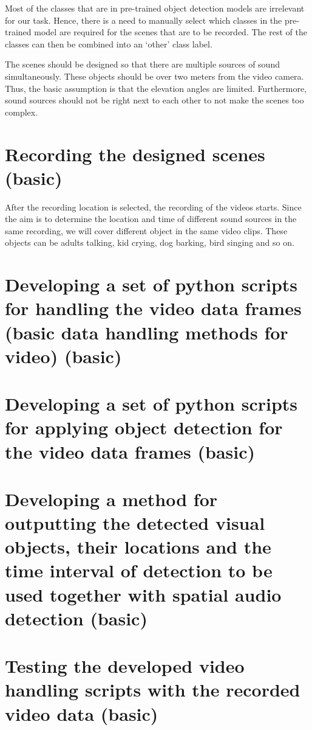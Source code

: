 Most of the classes that are in pre-trained object detection models are irrelevant for our task. Hence, there is a
need to manually select which classes in the pre-trained model are required for the scenes that are to be 
recorded. The rest of the classes can then be combined into an `other' class label.

The scenes should be designed so that there are multiple sources of sound simultaneously. These objects should
be over two meters from the video camera. Thus, the basic assumption is that the elevation angles are limited.
Furthermore, sound sources should not be right next to each other to not make the scenes too complex.

\section{Recording the designed scenes (basic)}
After the recording location is selected, the recording of the videos starts. Since the aim is to determine 
the location and time of different sound sources in the same recording, we will cover different object in the 
same video clips. These objects can be adults talking, kid crying, dog barking, bird singing and so on.

\section{Developing a set of python scripts for handling the video data frames (basic data handling methods for video) (basic)}

\section{Developing a set of python scripts for applying object detection for the video data frames (basic)}

\section{Developing a method for outputting the detected visual objects, their locations and the time interval of detection to be used together with spatial audio detection (basic)}

\section{Testing the developed video handling scripts with the recorded video data (basic)}

